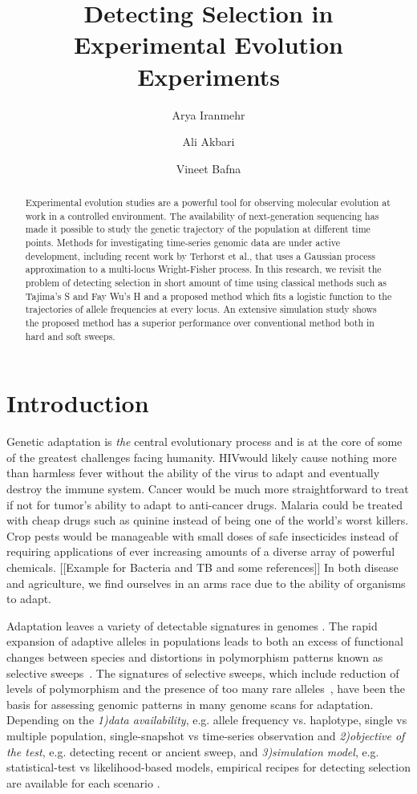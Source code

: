 \documentclass[11pt]{article}
\title{Detecting Selection in Experimental Evolution Experiments}
\author[1]{Arya Iranmehr}
\author[1]{Ali Akbari}
\author[2]{Vineet Bafna}
\affil[1]{\footnotesize Electrical and Computer Engineering, University of California, San Diego, La Jolla, CA 92093, USA.}
\affil[2]{\footnotesize Computer Science \& Engineering, University of California, San Diego, La Jolla, CA 92093, USA}
\date{}
\begin{document}
\maketitle
\begin{abstract}
Experimental evolution studies are a powerful tool for observing
molecular evolution at work in a controlled environment. The availability of
next-generation sequencing has made it possible to study the genetic trajectory 
of the population at different time points. Methods for investigating 
time-series genomic data are under active development, including recent work by 
Terhorst et al., that uses a Gaussian process approximation to a 
multi-locus Wright-Fisher process.  
In this research, we revisit the problem of detecting selection in short amount 
of time using classical methods such as
Tajima's S and Fay Wu's H and a proposed method which fits a logistic
function to the trajectories of allele frequencies at every locus. An extensive
simulation study shows the proposed method has a superior performance
over conventional method both in hard and soft sweeps.
\end{abstract}

\section{Introduction}
Genetic adaptation is \emph{the} central evolutionary process and is at the
 core of some of the greatest challenges facing humanity.  HIVwould likely
  cause nothing more than harmless fever without the
ability of the virus to adapt and eventually destroy the immune system. 
Cancer would be much more straightforward to treat if not for
tumor's ability to adapt to anti-cancer drugs. 
Malaria could be treated with cheap drugs such as quinine instead of 
being one of the world's worst killers. 
Crop pests would be manageable with small doses of safe insecticides 
instead of requiring applications of ever increasing amounts of a diverse array 
of powerful chemicals. [[Example for Bacteria and TB and some references]]
In both disease and agriculture, we find ourselves in an arms race due to the
ability of organisms to adapt.

Adaptation leaves a variety of detectable signatures in
genomes \cite{nielsen2005genomic,akey2009constructing,
kreitman2000methods,messer2013population,sabeti2006positive}.
The rapid expansion of adaptive alleles in populations leads to both an excess
of functional changes between species and distortions in polymorphism patterns
known as selective sweeps~\cite{nielsen2005genomic}. The signatures of
selective sweeps, which include reduction of levels of polymorphism and the
presence of too many rare alleles~\cite{nielsen2005genomic,
przeworski2002signature}, have been the basis for assessing genomic
patterns in many genome scans for adaptation. Depending on the
\emph{1)data availability}, e.g. allele frequency vs. haplotype, single vs 
multiple  population, single-snapshot vs time-series observation and 
\emph{2)objective of the test}, e.g. detecting recent or ancient
sweep, and \emph{3)simulation model}, e.g. statistical-test vs likelihood-based 
models, empirical recipes for detecting selection are available for each
scenario \cite{sabeti2006positive}.
\end{document}
